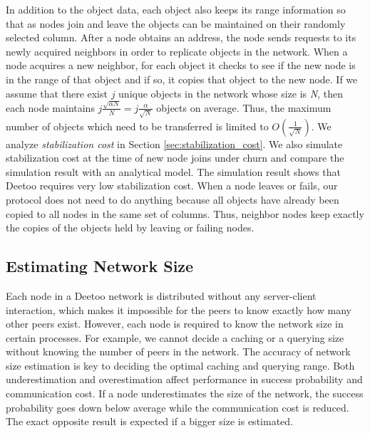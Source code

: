 \documentclass[9.5pt,journal,final,finalsubmission,twocolumn]{IEEEtran}
\begin{document}
In addition to the object data, each object also keeps its range information
so that as nodes join and
leave the objects can be maintained on their randomly selected column.
After a node obtains an address, the node sends requests to 
its newly acquired neighbors in order to replicate objects in the network.  
When a node acquires a new neighbor, for each object it checks to
see if the new node is in the range of that object and if so, it copies
that object to the new node.
If we assume that there exist $j$ unique objects in the network whose
size is \emph{N}, then each node maintains $j\frac{\sqrt{\alpha N}}{N} = j\frac{\alpha}{\sqrt{N}}$
objects on average.  Thus, the maximum number of objects which need to be
transferred is limited to $O(\frac{1}{\sqrt{N}})$.
We analyze \emph{stabilization cost} in Section \ref{sec:stabilization_cost}. 
We also simulate stabilization cost at the time of new node joins 
under churn and compare the simulation result with an analytical model.  
The simulation result shows that Deetoo requires very low stabilization cost. 
When a node leaves or fails, our protocol
does not need to do anything because all objects have already been copied to
all nodes in the same set of columns. Thus, neighbor nodes keep exactly
the copies of the objects held by leaving or failing nodes.

\subsection{Estimating Network Size}
Each node in a Deetoo network is distributed without any 
server-client interaction, which makes it impossible for the peers to know exactly how many other peers 
exist. However, each node is required to know the network size in certain processes. 
For example, we cannot decide a caching or a 
querying size without knowing the number of peers in the network.
The accuracy of network size estimation is key to deciding the optimal 
caching and querying range. 
Both underestimation and overestimation 
affect performance in success probability and communication cost. 
If a node underestimates the size of the network, 
the success probability goes down below average while the communication 
cost is reduced. The exact opposite result is expected if a bigger size 
is estimated. 
\end{document}

